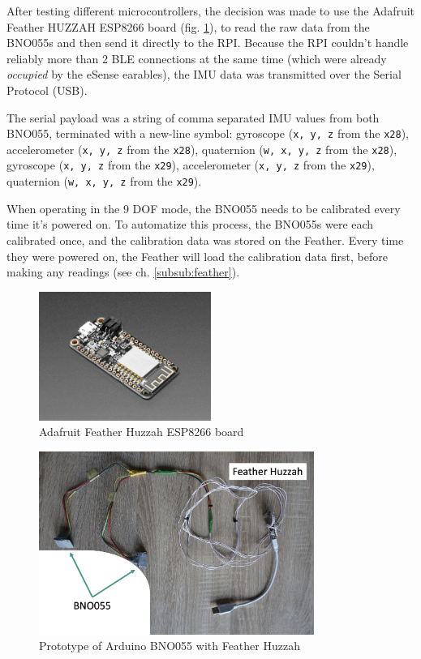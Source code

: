 After testing different microcontrollers, the decision was made to use the Adafruit Feather HUZZAH ESP8266 board (fig. \ref{image:feather}), to read the raw data from the BNO055s and then send it directly to the RPI. Because the RPI couldn't handle reliably more than 2 BLE connections at the same time (which were already \emph{occupied} by the eSense earables), the IMU data was transmitted over the Serial Protocol (USB).

The serial payload was a string of comma separated IMU values from both BNO055, terminated with a new-line symbol: gyroscope (\texttt{x, y, z} from the \texttt{x28}), accelerometer (\texttt{x, y, z} from the \texttt{x28}), quaternion (\texttt{w, x, y, z} from the \texttt{x28}), gyroscope (\texttt{x, y, z} from the \texttt{x29}), accelerometer (\texttt{x, y, z} from the \texttt{x29}), quaternion (\texttt{w, x, y, z} from the \texttt{x29}).

When operating in the 9 DOF mode, the BNO055 needs to be calibrated every time it's powered on. To automatize this process, the BNO055s were each calibrated once, and the calibration data was stored on the Feather. Every time they were powered on, the Feather will load the calibration data first, before making any readings (see ch. \ref{subsub:feather}).


\begin{figure}[h!]
\centering
\includegraphics[width=0.5\textwidth]{src/media/hardware/feather-huzzah.jpg}
\caption{Adafruit Feather Huzzah ESP8266 board}
\label{image:feather}
\end{figure}

\begin{figure}[h!]
\centering
\includegraphics[width=0.8\textwidth]{src/media/hardware/real-bno.png}
\caption{Prototype of Arduino BNO055 with Feather Huzzah}
\label{image:real-bno}
\end{figure}

